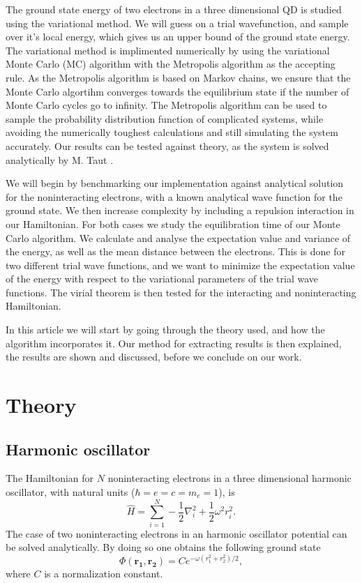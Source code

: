 \documentclass[%
 reprint,
nofootinbib,
aps,
]{revtex4-1}
\begin{document}
The ground state energy of two electrons in a three dimensional QD is studied using the variational method. We will guess on a trial wavefunction, and sample over it's local energy, which gives us an upper bound of the ground state energy. The variational method is implimented numerically by using the variational Monte Carlo (MC) algorithm with the Metropolis algorithm as the accepting rule. As the Metropolis algorithm is based on Markov chains, we ensure that the Monte Carlo algortihm converges towards the equilibrium state if the number of Monte Carlo cycles go to infinity. The Metropolis algorithm can be used to sample the probability distribution function of complicated systems, while avoiding the numerically toughest calculations and still simulating the system accurately. Our results can be tested against theory, as the system is solved analytically by M. Taut \cite{taut}.

We will begin by benchmarking our implementation against analytical solution for the noninteracting electrons, with a known analytical wave function for the ground state. We then increase complexity by including a repulsion interaction in our Hamiltonian. For both cases we study the equilibration time of our Monte Carlo algorithm. We calculate and analyse the expectation value and variance of the energy, as well as the mean distance between the electrons. This is done for two different trial wave functions, and we want to minimize the expectation value of the energy with respect to the variational parameters of the trial wave functions. The virial theorem is then tested for the interacting and noninteracting Hamiltonian.

In this article we will start by going through the theory used, and how the algorithm incorporates it. Our method for extracting results is then explained, the results are shown and discussed, before we conclude on our work.

\section{Theory}
\subsection{Harmonic oscillator}
The Hamiltonian for $N$ noninteracting electrons in a three dimensional harmonic oscillator, with natural units ($\hbar = e = c = m_e = 1$), is
\begin{equation}
  \hat{H} = \sum_{i=1}^{N} -\frac{1}{2}\nabla_i^2 + \frac{1}{2}\omega^2 r_i^2. \label{hamil_non_interact}
\end{equation}
The case of two noninteracting electrons in an harmonic oscillator potential can be solved analytically. By doing so one obtains the following ground state
\begin{equation}
\Phi(\mathbf{r_1}, \mathbf{r_2}) = C e^{-\omega(r_1^2 + r_2^2)/2},\label{anal_non_interaction_wf}
\end{equation}
where $C$ is a normalization constant.
\end{document}

